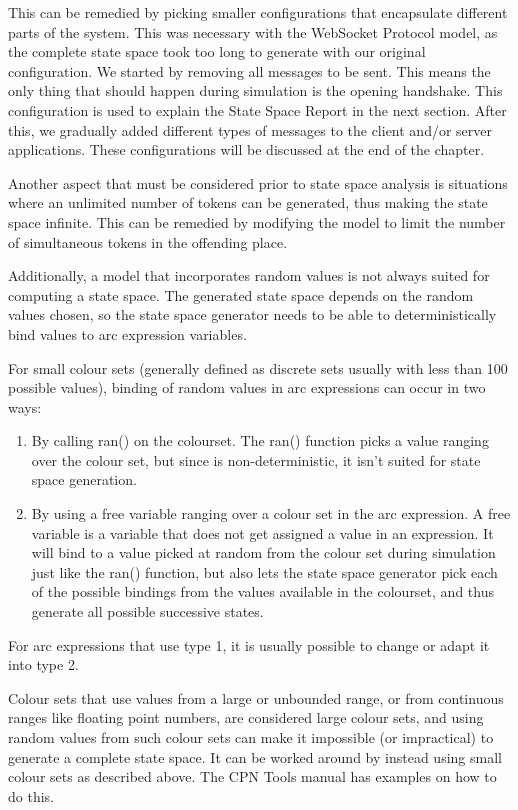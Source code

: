 		This can be remedied by picking smaller configurations that encapsulate
		different parts of the system. This was necessary with the WebSocket Protocol
		model, as the complete state space took too long to generate with our
		original configuration. 
		We started by removing all messages to be sent. This means the only thing that
		should happen during simulation is the opening handshake. This configuration
		is used to explain the State Space Report in the next section.
		After this, we gradually added different types of messages to the client
		and/or server applications. These configurations will be discussed at the end
		of the chapter.
		
		Another aspect that must be considered prior to state space analysis is
		situations where an unlimited number of tokens can be generated, thus making
		the state space infinite. This can be remedied by modifying the model to
		limit the number of simultaneous tokens in the offending place.
		
		Additionally, a model that incorporates random values is not always suited
		for computing a state space. The generated state space depends on the random
		values chosen, so the state space generator needs to be able to
		deterministically bind values to arc expression variables.
				
		For small colour sets (generally defined as discrete sets usually with less
		than 100 possible values), binding of random values in arc expressions can
		occur in two ways: 
		\begin{enumerate}
		\item By calling ran() on the colourset. The ran() function picks a value
		ranging over the colour set, but since is non-deterministic, it isn't
		suited for state space generation.
		\item By using a free variable ranging over a colour set in the arc expression.
		A free variable is a variable that does not get assigned a value in an expression. It will 
		bind to a value picked at random from the colour set during simulation just
		like the ran() function, but also lets the state space generator pick each of 
		the possible bindings from the values available in the colourset, and thus
		generate all possible successive states. 
		\end{enumerate}
		
		For arc expressions that use type 1, it is usually possible to change or
		adapt it into type 2.
		
		Colour sets that use values from a large or unbounded range, or from continuous
		ranges like floating point numbers, are considered large colour sets, and using
		random values from such colour sets can make it impossible (or impractical)
		to generate a complete state space. It can be worked around by
		instead using small colour sets as described above. The CPN Tools manual has
		examples on how to do this.
		
